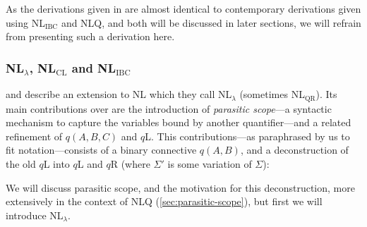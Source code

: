 As the derivations given in \citet{moortgat1996} are almost identical
to contemporary derivations given using NL$_{\text{IBC}}$ and NLQ, and
both will be discussed in later sections, we will refrain from
presenting such a derivation here.

\subsubsection{NL$_\lambda$, NL$_{\text{CL}}$ and NL$_{\text{IBC}}$}
\label{sec:nl-lambda-nl-cl-and-nl-ibc}
\citet{barker2007} and \citet{barker2015} describe an extension to NL
which they call NL$_\lambda$ (sometimes NL$_{\text{QR}}$). Its main
contributions over \citet{moortgat1996} are the introduction of
\emph{parasitic scope}---a syntactic mechanism to capture the
variables bound by another quantifier---and a related refinement of
 $q(A,B,C)$ and $q$L. This contributions---as
paraphrased by us to fit  notation---consists of
a binary connective $q(A,B)$, and a deconstruction of the old $q$L
into $q$L and $q$R (where $Σ'$ is some variation of $Σ$):
\begin{center}
  \begin{pfbox}
  \end{pfbox}
  \begin{pfbox}
  \end{pfbox}
\end{center}
We will discuss parasitic scope, and the motivation for this
deconstruction, more extensively in the context of NLQ
(\autoref{sec:parasitic-scope}), but first we will introduce
NL$_\lambda$.

